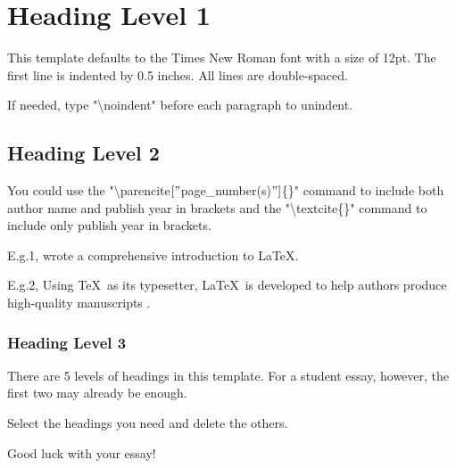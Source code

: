 \section{Heading Level 1}

This template defaults to the Times New Roman font with a size of 12pt. The first line is indented by 0.5 inches. All lines are double-spaced. 

\noindent If needed, type "\textbackslash noindent" before each paragraph to unindent.

\subsection{Heading Level 2}

You could use the "\textbackslash parencite$["$page\_number(s)$"]$\{\}" command to include both author name and publish year in brackets and the "\textbackslash textcite\{\}" command to include only publish year in brackets. 


E.g.1, \textcite{lshort} wrote a comprehensive introduction to \LaTeX.

E.g.2, Using \TeX \ as its typesetter, \LaTeX \ is developed to help authors produce high-quality manuscripts \parencite[1-2]{lshort}.


\subsubsection{Heading Level 3}

There are 5 levels of headings in this template. For a student essay, however, the first two may already be enough.

 Select the headings you need and delete the others.

 Good luck with your essay!